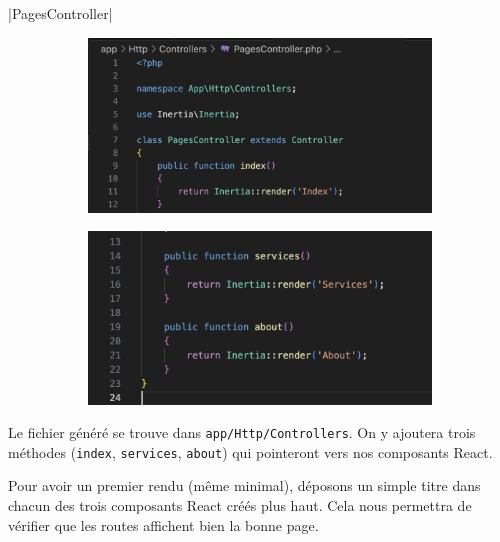|PagesController|
\begin{figure}[!h]
    \centering
    \begin{subfigure}{0.49\textwidth}
        \centering
        \includegraphics[width=\textwidth]{figures-C1/pages_controller_1a.png}
    \end{subfigure}
    \begin{subfigure}{0.49\textwidth}
        \centering
        \includegraphics[width=\textwidth]{figures-C1/pages_controller_1b.png}
    \end{subfigure}
    \caption{\protect{}\label{fig:PagesController1}}
\end{figure}

Le fichier généré se trouve dans \verb|app/Http/Controllers|.  
On y ajoutera trois méthodes (\verb|index|, \verb|services|, \verb|about|) qui pointeront vers nos composants React.

\newpage 

Pour avoir un premier rendu (même minimal), déposons un simple titre dans chacun des trois composants React créés plus haut.  
Cela nous permettra de vérifier que les routes affichent bien la bonne page.


